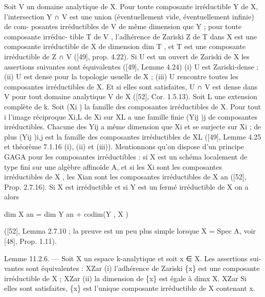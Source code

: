 \documentclass[
  10pt,
]{article}
\newenvironment{Shaded}{}{}
\newcommand{\NormalTok}[1]{#1}
\begin{document}
\begin{Shaded}
\begin{Highlighting}[]
\NormalTok{   Soit V un domaine analytique de X. Pour toute composante irréductible Y de X,}
\NormalTok{l’intersection Y ∩ V est une union (éventuellement vide, éventuellement infinie) de com{-}}
\NormalTok{posantes irréductibles de V de même dimension que Y ; pour toute composante irréduc{-}}
\NormalTok{tible T de V , l’adhérence de Zariski Z de T dans X est une composante irréductible de}
\NormalTok{X de dimension dim T , et T est une composante irréductible de Z ∩ V ([49], prop. 4.22).}
\NormalTok{   Si U est un ouvert de Zariski de X les assertions suivantes sont équivalentes ([49],}
\NormalTok{Lemme 4.24)}
\NormalTok{  (i) U est Zariski{-}dense ;}
\NormalTok{  (ii) U est dense pour la topologie usuelle de X ;}
\NormalTok{  (iii) U rencontre toutes les composantes irréductibles de X.}
\NormalTok{Et si elles sont satisfaites, U ∩ V est dense dans V pour tout domaine analytique V de}
\NormalTok{X ([52], Cor. 1.5.13).}
\NormalTok{   Soit L une extension complète de k. Soit (Xi ) la famille des composantes irréductibles}
\NormalTok{de X. Pour tout i l’image réciproque Xi,L de Xi sur XL a une famille finie (Yij )j de}
\NormalTok{composantes irréductibles. Chacune des Yij a même dimension que Xi et se surjecte sur}
\NormalTok{Xi ; de plus (Yij )i,j est la famille des composantes irréductibles de XL ([49], Lemme 4.25}
\NormalTok{et théorème 7.1.16 (i), (ii) et (iii)).}
\NormalTok{   Mentionnons qu’on dispose d’un principe GAGA pour les composantes irréductibles :}
\NormalTok{si X est un schéma localement de type fini sur une algèbre affinoïde A, et si les Xi sont}
\NormalTok{les composantes irréductibles de X , les Xian sont les composantes irréductibles de X an}
\NormalTok{([52], Prop. 2.7.16). Si X est irréductible et si Y est un fermé irréductible de X on a}
\NormalTok{alors}

\NormalTok{                          dim X an = dim Y an + codim(Y , X )}

\NormalTok{([52], Lemma 2.7.10 ; la preuve est un peu plus simple lorsque X = Spec A, voir [48],}
\NormalTok{Prop. 1.11).}


\NormalTok{Lemme 11.2.6. — Soit X un espace k{-}analytique et soit x ∈ X. Les assertions sui{-}}
\NormalTok{vantes sont équivalentes :}
\NormalTok{                                    XZar}
\NormalTok{  (i) l’adhérence de Zariski \{x\}      est une composante irréductible de X ;}
\NormalTok{                           XZar}
\NormalTok{  (ii) la dimension de \{x\}      est égale à dimx X.}
\NormalTok{                             XZar}
\NormalTok{Si elles sont satisfaites, \{x\}      est l’unique composante irréductible de X contenant x.}



\end{Highlighting}
\end{Shaded}
\end{document}
